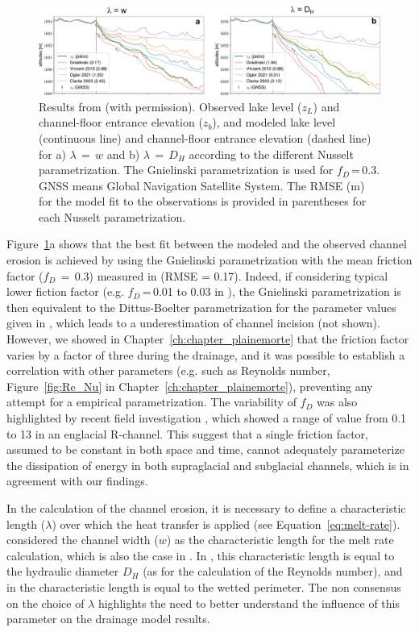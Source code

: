 \begin{figure}[h]
    \centering
    \includegraphics[width=1\textwidth]{chapters/Discussion/Bossons_models.pdf}
    \caption{Results from \cite{Gagliardini&al2024} (with permission). Observed lake level ($z_L$) and channel-floor entrance elevation ($z_b$), and modeled lake level (continuous line) and channel-floor entrance elevation (dashed line) for a) $\lambda\,=\,w$ and b) $\lambda\,=\,D_H$ according to the different Nusselt parametrization. The Gnielinski parametrization is used for $f_D$\,=\,0.3. GNSS means Global Navigation Satellite System. The RMSE (m) for the model fit to the observations is provided in parentheses for each Nusselt parametrization.}
    \label{fig:gag_nusselt}
\end{figure}


Figure~\ref{fig:gag_nusselt}a shows that the best fit between the modeled and the observed channel erosion is achieved by using the Gnielinski parametrization with the mean friction factor ($f_D\,=\,0.3$) measured in \cite{Ogier&al2021} (RMSE = 0.17). Indeed, if considering typical lower fiction factor (e.g. $f_D$\,=\,0.01 to 0.03 in \cite{Ancey&al2019}), the Gnielinski parametrization is then equivalent to the Dittus-Boelter parametrization for the parameter values given in \cite{Clarke2003}, which leads to a underestimation of channel incision (not shown). However, we showed in Chapter~\ref{ch:chapter_plainemorte} that the friction factor varies by a factor of three during the drainage, and it was possible to establish a correlation with other parameters (e.g. such as Reynolds number, Figure~\ref{fig:Re_Nu} in Chapter~\ref{ch:chapter_plainemorte}), preventing any attempt for a empirical parametrization. The variability of $f_D$ was also highlighted by recent field investigation \citep{pohle&&2022}, which showed a range of value from 0.1 to 13 in an englacial R-channel. This suggest that a single friction factor, assumed to be constant in both space and time, cannot adequately parameterize the dissipation of energy in both supraglacial and subglacial channels, which is in agreement with our findings.

In the calculation of the channel erosion, it is necessary to define a characteristic length ($\lambda$) over which the heat transfer is applied (see Equation~\ref{eq:melt-rate}). \cite{Gagliardini&al2024} considered the channel width ($w$) as the characteristic length for the melt rate calculation, which is also the case in \cite{Vincent&al2010}. In \cite{Clarke2003,Ogier&al2021,Sommers&Rajaram2020}, this characteristic length is equal to the hydraulic diameter $D_H$ (as for the calculation of the Reynolds number), and in \cite{Walder&Costa1996} the characteristic length is equal to the wetted perimeter. The non consensus on the choice of $\lambda$ highlights the need to better understand the influence of this parameter on the drainage model results.


